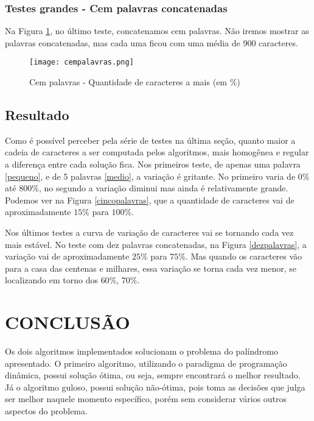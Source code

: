 \documentclass[12pt]{article}
\begin{document}
\subsubsection{Testes grandes - Cem palavras concatenadas}
\label{grande100}

Na Figura \ref{cempalavras}, no último teste, concatenamos cem palavras. Não iremos mostrar as palavras concatenadas, mas cada uma ficou com uma média de $900$ caracteres.

    \begin{figure}[h!]
        \centering
        \texttt{[image: cempalavras.png]}
        \caption{Cem palavras - Quantidade de caracteres a mais (em \%)}
        \label{cempalavras}
    \end{figure}

\subsection{Resultado}

	Como é possível perceber pela série de testes na última seção, quanto maior a cadeia de caracteres a ser computada pelos algoritmos, mais homogênea e regular a diferença entre cada solução fica. Nos primeiros teste, de apenas uma palavra \ref{pequeno}, e de 5 palavras \ref{medio}, a variação é gritante. No primeiro varia de $0\%$ até $800\%$, no segundo a variação diminui mas ainda é relativamente grande. Podemos ver na Figura \ref{cincopalavras}, que a quantidade de caracteres vai de aproximadamente $15\%$ para $100\%$.

	Nos últimos testes a curva de variação de caracteres vai se tornando cada vez mais estável. No teste com dez palavras concatenadas, na Figura \ref{dezpalavras}, a variação vai de aproximadamente $25\%$ para $75\%$. Mas quando os caracteres vão para a casa das centenas e milhares, essa variação se torna cada vez menor, se localizando em torno dos $60\%$, $70\%$.


\section{CONCLUSÃO}
\label{conclusao}

    Os dois algoritmos implementados solucionam o problema do palíndromo apresentado. O primeiro algoritmo, utilizando o paradigma de programação dinâmica, possui solução ótima, ou seja, sempre encontrará o melhor resultado. Já o algoritmo guloso, possui solução não-ótima, pois toma as decisões que julga ser melhor naquele momento específico, porém sem considerar vários outros aspectos do problema.
\end{document}
